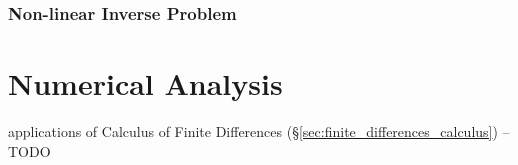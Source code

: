 {\subsubsection{Non-linear Inverse Problem}\label{sec:nonlinear_inverse_problem}



\section{Numerical Analysis}\label{sec:numerical_analysis}

applications of Calculus of Finite Differences
(\S\ref{sec:finite_differences_calculus}) --TODO

}
